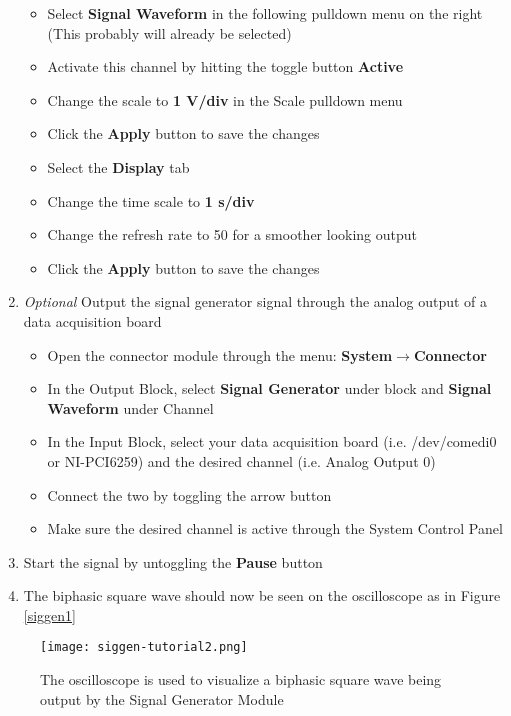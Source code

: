 \begin{enumerate}
\begin{itemize}
  \item Select \textbf{Signal Waveform} in the following pulldown menu on the right (This probably will already be selected)
  \item Activate this channel by hitting the toggle button \textbf{Active}
  \item Change the scale to \textbf{1 V/div} in the Scale pulldown menu
  \item Click the \textbf{Apply} button to save the changes
  \item Select the \textbf{Display} tab
  \item Change the time scale to \textbf{1 s/div}
  \item Change the refresh rate to 50 for a smoother looking output
  \item Click the \textbf{Apply} button to save the changes
  \end{itemize}
\item \textit{Optional} Output the signal generator signal through the analog output of a data acquisition board
  \begin{itemize}
  \item Open the connector module through the menu: \textbf{System}$\rightarrow$\textbf{Connector}
  \item In the Output Block, select \textbf{Signal Generator} under block and \textbf{Signal Waveform} under Channel
  \item In the Input Block, select your data acquisition board (i.e. /dev/comedi0 or NI-PCI6259) and the desired channel (i.e. Analog Output 0)
  \item Connect the two by toggling the arrow button
  \item Make sure the desired channel is active through the System Control Panel
  \end{itemize}
\item Start the signal by untoggling the \textbf{Pause} button
\item The biphasic square wave should now be seen on the oscilloscope as in Figure \ref{siggen1}
\end{enumerate}

\begin{figure}[h]
\begin{center}
\texttt{[image: siggen-tutorial2.png]} 
\caption[Signal Generator Output]{The oscilloscope is used to visualize a biphasic square wave being output by the Signal Generator Module} 
\end{center}
\label{siggen2}
\end{figure}
